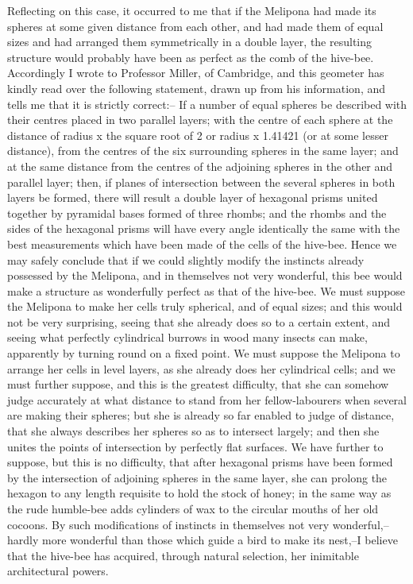 Reflecting on this case, it occurred to me that if the Melipona had made its spheres at some given distance from each other, and had made them of equal sizes and had arranged them symmetrically in a double layer, the resulting structure would probably have been as perfect as the comb of the hive-bee. Accordingly I wrote to Professor Miller, of Cambridge, and this geometer has kindly read over the following statement, drawn up from his information, and tells me that it is strictly correct:--
If a number of equal spheres be described with their centres placed in two parallel layers; with the centre of each sphere at the distance of radius x the square root of 2 or radius x 1.41421 (or at some lesser distance), from the centres of the six surrounding spheres in the same layer; and at the same distance from the centres of the adjoining spheres in the other and parallel layer; then, if planes of intersection between the several spheres in both layers be formed, there will result a double layer of hexagonal prisms united together by pyramidal bases formed of three rhombs; and the rhombs and the sides of the hexagonal prisms will have every angle identically the same with the best measurements which have been made of the cells of the hive-bee.
Hence we may safely conclude that if we could slightly modify the instincts already possessed by the Melipona, and in themselves not very wonderful, this bee would make a structure as wonderfully perfect as that of the hive-bee. We must suppose the Melipona to make her cells truly spherical, and of equal sizes; and this would not be very surprising, seeing that she already does so to a certain extent, and seeing what perfectly cylindrical burrows in wood many insects can make, apparently by turning round on a fixed point. We must suppose the Melipona to arrange her cells in level layers, as she already does her cylindrical cells; and we must further suppose, and this is the greatest difficulty, that she can somehow judge accurately at what distance to stand from her fellow-labourers when several are making their spheres; but she is already so far enabled to judge of distance, that she always describes her spheres so as to intersect largely; and then she unites the points of intersection by perfectly flat surfaces. We have further to suppose, but this is no difficulty, that after hexagonal prisms have been formed by the intersection of adjoining spheres in the same layer, she can prolong the hexagon to any length requisite to hold the stock of honey; in the same way as the rude humble-bee adds cylinders of wax to the circular mouths of her old cocoons. By such modifications of instincts in themselves not very wonderful,--hardly more wonderful than those which guide a bird to make its nest,--I believe that the hive-bee has acquired, through natural selection, her inimitable architectural powers.
